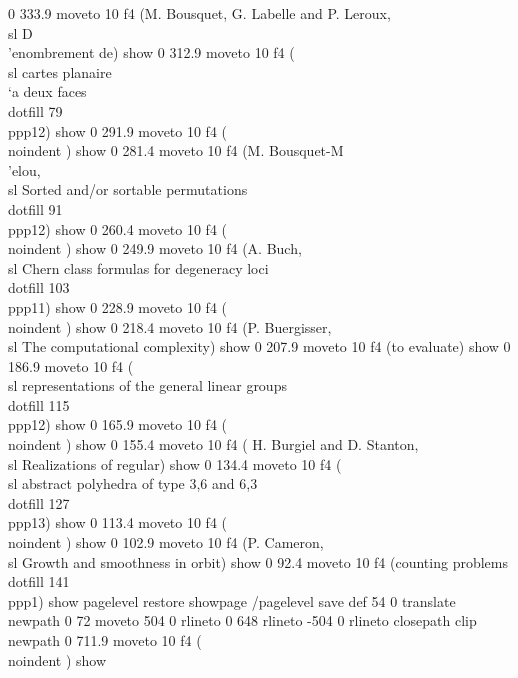 0 333.9 moveto
10 f4
(M. Bousquet, G. Labelle and P. Leroux,  {\\sl D\\'enombrement de}) show
0 312.9 moveto
10 f4
({\\sl cartes planaire \\`a deux faces}\\dotfill 79\\ppp{12}) show
0 291.9 moveto
10 f4
(\\noindent ) show
0 281.4 moveto
10 f4
(M. Bousquet-M\\'elou, {\\sl Sorted and/or sortable permutations}\\dotfill  91\\ppp{12}) show
0 260.4 moveto
10 f4
(\\noindent     ) show
0 249.9 moveto
10 f4
(A. Buch,  {\\sl Chern class formulas for degeneracy loci}\\dotfill  103\\ppp{11}) show
0 228.9 moveto
10 f4
(\\noindent     ) show
0 218.4 moveto
10 f4
(P. Buergisser,  {\\sl The computational complexity) show
0 207.9 moveto
10 f4
(to evaluate}) show
0 186.9 moveto
10 f4
({\\sl  representations of the general linear groups}\\dotfill   115\\ppp{12}) show
0 165.9 moveto
10 f4
(\\noindent    ) show
0 155.4 moveto
10 f4
( H. Burgiel and D. Stanton,  {\\sl Realizations of regular}) show
0 134.4 moveto
10 f4
({\\sl  abstract polyhedra of type {3,6} and {6,3}}\\dotfill   127\\ppp{13}) show
0 113.4 moveto
10 f4
(\\noindent     ) show
0 102.9 moveto
10 f4
(P. Cameron,  {\\sl Growth and smoothness in orbit) show
0 92.4 moveto
10 f4
(counting problems}\\dotfill   141\\ppp{1}) show
pagelevel restore
showpage
/pagelevel save def
54 0 translate
newpath 0 72 moveto 504 0 rlineto 0 648 rlineto -504 0 rlineto  closepath clip newpath
0 711.9 moveto
10 f4
(\\noindent     ) show
